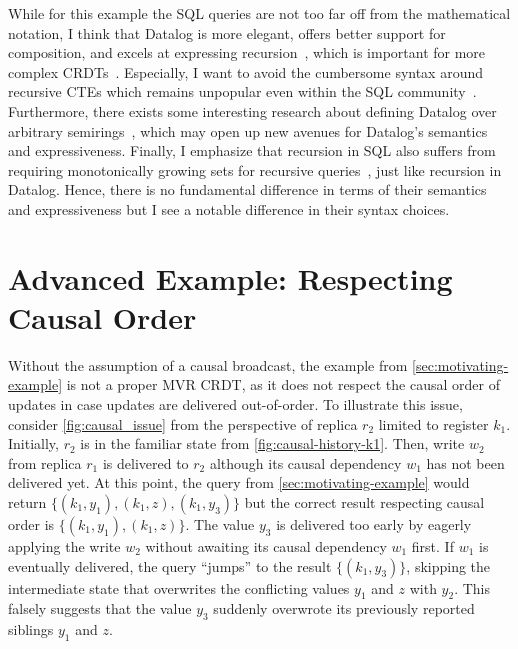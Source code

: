 While for this example the SQL queries are not too far off from the mathematical
notation, I think that Datalog is more elegant, offers better support for
composition, and excels at expressing recursion~\cite{abo2024convergence},
which is important for more complex CRDTs~\cite{kleppmann2018data}.
Especially, I want to avoid the cumbersome syntax around recursive
CTEs which remains unpopular even within the SQL
community~\cite{neumann2024critique, hirn2023fix, mcsherry2022recursion}.
Furthermore, there exists some interesting research about defining Datalog
over arbitrary semirings~\cite{abo2024convergence, khamis2022datalog},
which may open up new avenues for Datalog's semantics and expressiveness.
Finally, I emphasize that recursion in SQL also suffers from requiring
monotonically growing sets for recursive queries~\cite{hirn2023fix},
just like recursion in Datalog.
Hence, there is no fundamental difference in terms of their semantics and
expressiveness but I see a notable difference in their syntax choices.

\section{Advanced Example: Respecting Causal Order}\label{sec:advanced_example}



Without the assumption of a causal broadcast,
the example from \autoref{sec:motivating-example} is not a proper \ac{MVR} \ac{CRDT},
as it does not respect the causal order of updates in case updates are delivered
out-of-order.
To illustrate this issue, consider \autoref{fig:causal_issue} from the
perspective of replica \(r_2\) limited to register \(k_1\).
Initially, \(r_2\) is in the familiar state from \autoref{fig:causal-history-k1}.
Then, write \(w_2\) from replica \(r_1\) is delivered to \(r_2\) although its
causal dependency \(w_1\) has not been delivered yet.
At this point, the query from \autoref{sec:motivating-example} would return
\(\{ (k_1, y_1), (k_1, z), (k_1, y_3)\} \)
but the correct result respecting causal order is
\(\{ (k_1, y_1), (k_1, z) \}\).
The value \(y_3\) is delivered too early by eagerly applying the write \(w_2\)
without awaiting its causal dependency \(w_1\) first.
If \(w_1\) is eventually delivered, the query ``jumps'' to the result
\( \{ (k_1, y_3) \} \), skipping the intermediate state
that overwrites the conflicting values \(y_1\) and \(z\) with \(y_2\).
This falsely suggests that the value \(y_3\) suddenly overwrote its previously
reported siblings \(y_1\) and \(z\).

